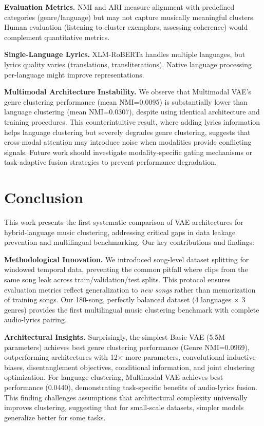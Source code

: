 \documentclass[10pt,twocolumn]{article}
\begin{document}
\textbf{Evaluation Metrics.} NMI and ARI measure alignment with predefined categories (genre/language) but may not capture musically meaningful clusters. Human evaluation (listening to cluster exemplars, assessing coherence) would complement quantitative metrics.

\textbf{Single-Language Lyrics.} XLM-RoBERTa handles multiple languages, but lyrics quality varies (translations, transliterations). Native language processing per-language might improve representations.

\textbf{Multimodal Architecture Instability.} We observe that Multimodal VAE's genre clustering performance (mean NMI=0.0095) is substantially lower than language clustering (mean NMI=0.0307), despite using identical architecture and training procedures. This counterintuitive result, where adding lyrics information helps language clustering but severely degrades genre clustering, suggests that cross-modal attention may introduce noise when modalities provide conflicting signals. Future work should investigate modality-specific gating mechanisms or task-adaptive fusion strategies to prevent performance degradation.

\section{Conclusion}
\label{sec:conclusion}

This work presents the first systematic comparison of VAE architectures for hybrid-language music clustering, addressing critical gaps in data leakage prevention and multilingual benchmarking. Our key contributions and findings:

\textbf{Methodological Innovation.} We introduced song-level dataset splitting for windowed temporal data, preventing the common pitfall where clips from the same song leak across train/validation/test splits. This protocol ensures evaluation metrics reflect generalization to \emph{new songs} rather than memorization of training songs. Our 180-song, perfectly balanced dataset (4 languages $\times$ 3 genres) provides the first multilingual music clustering benchmark with complete audio-lyrics pairing.

\textbf{Architectural Insights.} Surprisingly, the simplest Basic VAE (5.5M parameters) achieves best genre clustering performance (Genre NMI=0.0969), outperforming architectures with 12× more parameters, convolutional inductive biases, disentanglement objectives, conditional information, and joint clustering optimization. For language clustering, Multimodal VAE achieves best performance (0.0440), demonstrating task-specific benefits of audio-lyrics fusion. This finding challenges assumptions that architectural complexity universally improves clustering, suggesting that for small-scale datasets, simpler models generalize better for some tasks.
\end{document}

